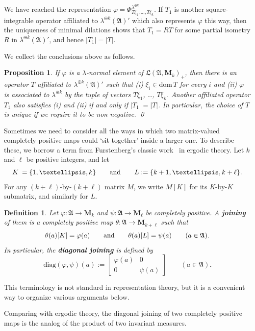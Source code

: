 \documentclass[12pt,a4paper]{article}
\numberwithin{equation}{section}
\newtheorem{prop}[thm]{Proposition}
\newtheorem{dfn}[thm]{Definition}
\theoremstyle{remark}
\renewcommand{\rm}[1]{\mathrm{#1}}
\newcommand{\rmM}{\mathbf{M}}
\newcommand{\A}{\mathfrak{A}}
\newcommand{\frL}{\mathfrak{L}}
\renewcommand{\phi}{\varphi}
\renewcommand{\l}{\lambda}
\newcommand{\dom}{\mathrm{dom}\,}
\begin{document}
We have reached the representation $\phi = \Phi^{\l^{\oplus k}}_{T\xi_1,\dots,T\xi_k}$.  If $T_1$ is another square-integrable operator affiliated to $\l^{\oplus k}(\A)'$ which also represents $\phi$ this way, then the uniqueness of minimal dilations shows that $T_1 = RT$ for some partial isometry $R$ in $\l^{\oplus k}(\A)'$, and hence $|T_1| = |T|$.

We collect the conclusions above as follows.

\begin{prop}\label{prop:RadNik}
If $\phi$ is a $\l$-normal element of $\frL(\A,\rmM_k)_+$, then there is an operator $T$ affiliated to $\l^{\oplus k}(\A)'$ such that (i) $\xi_i \in \dom T$ for every $i$ and (ii) $\phi$ is associated to $\l^{\oplus k}$ by the tuple of vectors $T\xi_1$, \dots, $T\xi_k$.  Another affiliated operator $T_1$ also satisfies (i) and (ii) if and only if $|T_1| = |T|$.  In particular, the choice of $T$ is unique if we require it to be non-negative. \qed
\end{prop}

Sometimes we need to consider all the ways in which two matrix-valued completely positive maps could `sit together' inside a larger one.  To describe these, we borrow a term from Furstenberg's classic work~\cite{Fur67} in ergodic theory.  Let $k$ and $\ell$ be positive integers, and let
\[K \:= \{1,\dots,k\} \qquad \hbox{and} \qquad L := \{k+1,\dots,k+\ell\}.\]
For any $(k+\ell)$-by-$(k+\ell)$ matrix $M$, we write $M[K]$ for its $K$-by-$K$ submatrix, and similarly for $L$.

\begin{dfn}\label{dfn:joining}
Let $\phi:\A \to \rmM_k$ and $\psi:\A \to \rmM_\ell$ be completely positive.  A \textbf{joining} of them is a completely positive map $\theta:\A\to \rmM_{k+\ell}$ such that
\[\theta(a)[K] = \phi(a) \qquad \hbox{and} \qquad \theta(a)[L] = \psi(a) \qquad (a \in \A).\]
In particular, the \textbf{diagonal joining} is defined by
\[\rm{diag}(\phi,\psi)(a) := \left[\begin{array}{cc} \phi(a) & 0\\ 0 & \psi(a)\end{array}\right] \qquad (a \in \A).\]
\end{dfn}

This terminology is not standard in representation theory, but it is a convenient way to organize various arguments below.

Comparing with ergodic theory, the diagonal joining of two completely positive maps is the analog of the product of two invariant measures.
\end{document}
